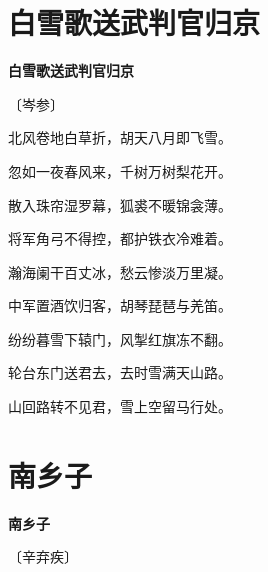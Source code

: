 \documentclass[12pt,UTF-8,openany,fontset=none]{ctexbook}
\begin{document}
\vspace{8pt}
\clearpage

\section{白雪歌送武判官归京}


\begin{center}
    {\bfseries 白雪歌送武判官归京}

    \vspace{18pt}

    \begin{large}\xuwen
        〔岑参〕
    \end{large}

\end{center}

    \vspace{18pt}  %

\begin{center}
    \begin{Large}

        北风卷地白草折，胡天八月即飞雪。

        忽如一夜春风来，千树万树梨花开。

        散入珠帘湿罗幕，狐裘不暖锦衾薄。

        将军角弓不得控，都护铁衣冷难着。

        瀚海阑干百丈冰，愁云惨淡万里凝。

        中军置酒饮归客，胡琴琵琶与羌笛。

        纷纷暮雪下辕门，风掣红旗冻不翻。

        轮台东门送君去，去时雪满天山路。

        山回路转不见君，雪上空留马行处。

    \end{Large}

\end{center}

\vspace{8pt}
\clearpage

\section{南乡子}


\begin{center}
    {\bfseries 南乡子}

    \vspace{18pt}

    \begin{large}\xuwen
        〔辛弃疾〕
    \end{large}

\end{center}
\end{document}
